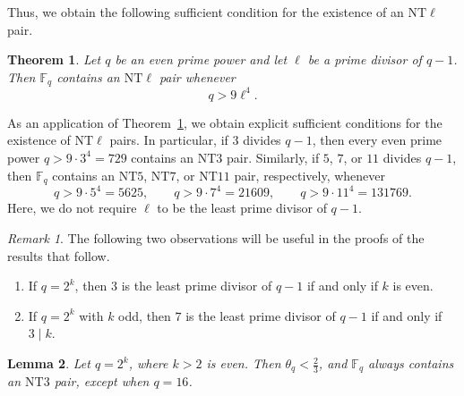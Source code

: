 \documentclass[12pt]{amsart}
\newtheorem{theorem}{Theorem}[section]
\newtheorem{lemma}[theorem]{Lemma}
\theoremstyle{definition}
\theoremstyle{remark}
\newtheorem*{remark}{Remark}
\numberwithin{equation}{section}
\begin{document}
Thus, we obtain the following sufficient condition for the existence of an $\mathrm{NT}\ell$ pair.
\begin{theorem}\label{T2.1}
Let $q$ be an even prime power and let $\ell$ be a prime divisor of $q-1$. Then $\mathbb{F}_q$ contains an $\mathrm{NT}\ell$ pair whenever
\[
q>9\ell^4.
\]
\end{theorem}
As an application of Theorem~\ref{T2.1}, we obtain explicit sufficient conditions for the existence of $\mathrm{NT}\ell$ pairs. In particular, if $3$ divides $q-1$, then every even prime power $q>9\cdot3^4=729$ contains an $\mathrm{NT}3$ pair. Similarly, if $5$, $7$, or $11$ divides $q-1$, then $\mathbb{F}_q$ contains an $\mathrm{NT}5$, $\mathrm{NT}7$, or $\mathrm{NT}11$ pair, respectively, whenever
\[
q>9\cdot5^4=5625,\qquad
q>9\cdot7^4=21609,\qquad
q>9\cdot11^4=131769.
\]
Here, we do not require $\ell$ to be the least prime divisor of $q-1$.
\begin{remark}
The following two observations will be useful in the proofs of the results that follow.
\begin{enumerate}
    \item If $q=2^k$, then $3$ is the least prime divisor of $q-1$ if and only if $k$ is even.
    \item If $q=2^k$ with $k$ odd, then $7$ is the least prime divisor of $q-1$ if and only if $3\mid k$.
\end{enumerate}
\end{remark}

\begin{lemma}\label{L2.2}
Let $q=2^k$, where $k>2$ is even. Then $\theta_q<\frac{2}{3}$, and $\mathbb{F}_q$ always contains an $\mathrm{NT}3$ pair, except when $q=16$.
\end{lemma}
\end{document}
